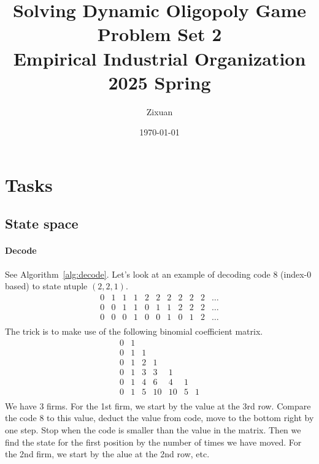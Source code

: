 \documentclass[12pt]{article}[margin=1in]
\title{\textbf{Solving Dynamic Oligopoly Game} \\
    \vspace{.3cm}
    \large Problem Set 2 \\
    Empirical Industrial Organization 2025 Spring}
\author{Zixuan}
\date{\today}
\begin{document}
\maketitle

\setcounter{page}{1}

\section{Tasks}
\subsection{State space}
\paragraph{Decode} See Algorithm~\ref{alg:decode}. Let's look at an example of decoding code 8 (index-0 based) to state ntuple $(2,2,1)$.
\begin{equation*}
    \begin{array}{cccccccccccc}
        0 & 1 & 1 & 1 & 2 & 2 & 2 & 2 & 2 & 2 & \ldots \\
        0 & 0 & 1 & 1 & 0 & 1 & 1 & 2 & 2 & 2 & \ldots \\
        0 & 0 & 0 & 1 & 0 & 0 & 1 & 0 & 1 & 2 & \ldots \\
    \end{array}
\end{equation*}
The trick is to make use of the following binomial coefficient matrix.
\begin{equation*}
    \begin{array}{ccccccc}
        0 & 1 &   &    &            \\
        0 & 1 & 1 &    &            \\
        0 & 1 & 2 & 1  &            \\
        0 & 1 & 3 & 3  & 1          \\
        0 & 1 & 4 & 6  & 4  & 1     \\
        0 & 1 & 5 & 10 & 10 & 5 & 1 \\
    \end{array}
\end{equation*}
We have 3 firms. For the 1st firm, we start by the value at the 3rd row. Compare the code 8 to this value, deduct the value from code, move to the bottom right by one step. Stop when the code is smaller than the value in the matrix. Then we find the state for the first position by the number of times we have moved. For the 2nd firm, we start by the alue at the 2nd row, etc.
\end{document}
